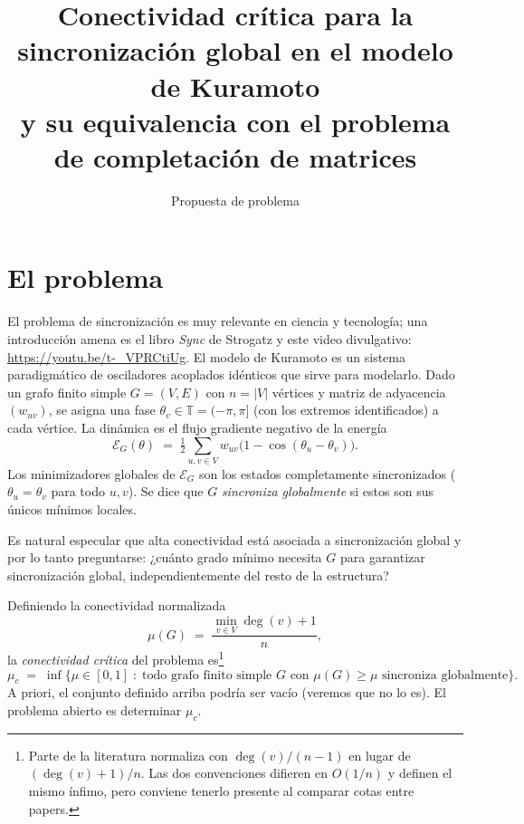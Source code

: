 \documentclass[11pt,a4paper]{article}
\title{\vspace{-2.5em}Conectividad crítica para la sincronización global en el modelo de Kuramoto\\[4pt]
\large y su equivalencia con el problema de completación de matrices}
\author{Propuesta de problema}
\date{}
\begin{document}
\maketitle
\vspace{-2em}

\section*{El problema}

El problema de sincronización es muy relevante en ciencia y tecnología; una introducción amena es el libro \emph{Sync} de Strogatz \cite{strogatz-sync} y este video divulgativo: \url{https://youtu.be/t-_VPRCtiUg}. El modelo de Kuramoto es un sistema paradigmático de osciladores acoplados idénticos que sirve para modelarlo. Dado un grafo finito simple $G=(V,E)$ con $n=|V|$ vértices y matriz de adyacencia $(w_{uv})$, se asigna una fase $\theta_v \in \mathbb{T} = (-\pi,\pi]$ (con los extremos identificados) a cada vértice. La dinámica es el flujo gradiente negativo de la energía
\[
\mathcal{E}_G(\theta) \;=\; \tfrac{1}{2}\sum_{u,v\in V} w_{uv}\bigl(1-\cos(\theta_u-\theta_v)\bigr).
\]
Los minimizadores globales de $\mathcal{E}_G$ son los estados completamente sincronizados ($\theta_u=\theta_v$ para todo $u,v$). Se dice que $G$ \emph{sincroniza globalmente} si estos son sus únicos mínimos locales.

Es natural especular que alta conectividad está asociada a sincronización global y por lo tanto preguntarse: ¿cuánto grado mínimo necesita $G$ para garantizar sincronización global, independientemente del resto de la estructura?

Definiendo la conectividad normalizada
\[
\mu(G) \;=\; \frac{\min_{v\in V}\deg(v) + 1}{n},
\]
la \emph{conectividad crítica} del problema es\footnote{Parte de la literatura normaliza con $\deg(v)/(n-1)$ en lugar de $(\deg(v)+1)/n$. Las dos convenciones difieren en $O(1/n)$ y definen el mismo ínfimo, pero conviene tenerlo presente al comparar cotas entre papers.}
\[
\mu_c \;=\; \inf\bigl\{\mu\in[0,1] \;:\; \text{todo grafo finito simple $G$ con }\mu(G)\ge \mu\text{ sincroniza globalmente}\bigr\}.
\]
A priori, el conjunto definido arriba podría ser vacío (veremos que no lo es). El problema abierto es determinar $\mu_c$.
\end{document}
